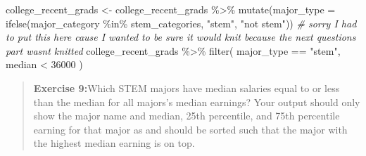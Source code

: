 \documentclass[
]{article}
\newenvironment{Shaded}{\begin{snugshade}}{\end{snugshade}}
\newcommand{\AttributeTok}[1]{\textcolor[rgb]{0.77,0.63,0.00}{#1}}
\newcommand{\CommentTok}[1]{\textcolor[rgb]{0.56,0.35,0.01}{\textit{#1}}}
\newcommand{\DecValTok}[1]{\textcolor[rgb]{0.00,0.00,0.81}{#1}}
\newcommand{\FunctionTok}[1]{\textcolor[rgb]{0.00,0.00,0.00}{#1}}
\newcommand{\NormalTok}[1]{#1}
\newcommand{\OtherTok}[1]{\textcolor[rgb]{0.56,0.35,0.01}{#1}}
\newcommand{\SpecialCharTok}[1]{\textcolor[rgb]{0.00,0.00,0.00}{#1}}
\newcommand{\StringTok}[1]{\textcolor[rgb]{0.31,0.60,0.02}{#1}}
\begin{document}
\begin{Shaded}
\begin{Highlighting}[]
\NormalTok{college\_recent\_grads }\OtherTok{\textless{}{-}}\NormalTok{ college\_recent\_grads }\SpecialCharTok{\%\textgreater{}\%}
  \FunctionTok{mutate}\NormalTok{(}\AttributeTok{major\_type =} \FunctionTok{ifelse}\NormalTok{(major\_category }\SpecialCharTok{\%in\%}\NormalTok{ stem\_categories, }\StringTok{"stem"}\NormalTok{, }\StringTok{"not stem"}\NormalTok{))}
\CommentTok{\# sorry I had to put this here cause I wanted to be sure it would knit because the next questions part wasn\textquotesingle{}t knitted}
\NormalTok{college\_recent\_grads }\SpecialCharTok{\%\textgreater{}\%}
  \FunctionTok{filter}\NormalTok{(}
\NormalTok{    major\_type }\SpecialCharTok{==} \StringTok{"stem"}\NormalTok{,}
\NormalTok{    median }\SpecialCharTok{\textless{}} \DecValTok{36000}
\NormalTok{  )}
\end{Highlighting}
\end{Shaded}

\begin{quote}
\textbf{Exercise 9:}Which STEM majors have median salaries equal to or
less than the median for all majors's median earnings? Your output
should only show the major name and median, 25th percentile, and 75th
percentile earning for that major as and should be sorted such that the
major with the highest median earning is on top.
\end{quote}

\begin{Shaded}
\end{Shaded}
\end{document}
